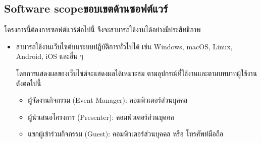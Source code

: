 \subsection{\ifenglish Software scope\else ขอบเขตด้านซอฟต์แวร์\fi}
โครงการนี้ต้องการซอฟต์แวร์ต่อไปนี้ จึงจะสามารถใช้งานได้อย่างมีประสิทธิภาพ
\begin{itemize}
    \item สามารถใช้งานเว็บไซต์บนระบบปฏิบัติการทั่วไปได้ เช่น Windows, macOS, Linux, Android, iOS และอื่น ๆ

          โดยการแสดงผลของเว็บไซต์จะแสดงผลได้เหมาะสม ตามอุปกรณ์ที่ใช้งานและตามบทบาทผู้ใช้งานดังต่อไปนี้
          \begin{itemize}
              \item ผู้จัดงานกิจกรรม (Event Manager):
                    คอมพิวเตอร์ส่วนบุคคล
              \item ผู้นำเสนอโครงการ (Presenter):
                    คอมพิวเตอร์ส่วนบุคคล
              \item แขกผู้เข้าร่วมกิจกรรม (Guest):
                    คอมพิวเตอร์ส่วนบุคคล หรือ โทรศัพท์มือถือ
          \end{itemize}
\end{itemize}

